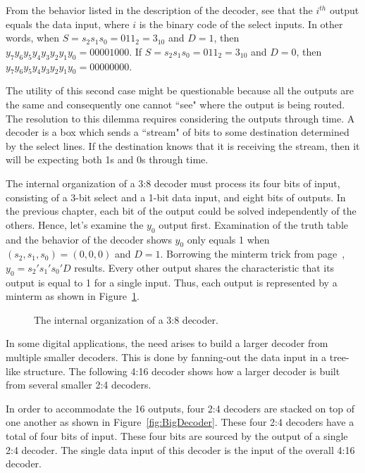 From the behavior listed in the description of the decoder, 
see that the $i^{th}$ output equals the data input, where
$i$ is the binary code of the select inputs.  In other
words, when $S=s_2 s_1 s_0 = 011_2 = 3_{10}$ and $D=1$,
then $y_7 y_6 y_5 y_4 y_3 y_2 y_1 y_0 = 00001000$.  If 
$S= s_2 s_1 s_0 = 011_2 = 3_{10}$ and $D=0$, then
$y_7 y_6 y_5 y_4 y_3 y_2 y_1 y_0 = 00000000$.   

The utility of this second case might be questionable because
all the outputs are the same and consequently one cannot
``see" where the output is being routed.  The resolution
to this dilemma requires considering the outputs 
through time.  A decoder is a box which sends a ``stream" of 
bits to some destination determined by the select lines.
If the destination knows that it is receiving the stream, then it
will be expecting both 1s and 0s through time.

The internal organization of a 3:8 decoder must process its four bits
of input, consisting of a 3-bit select and a 1-bit data input, and
eight bits of outputs.  In 
the previous chapter, each bit of the output could
be solved independently of the others. Hence, let's examine the $y_0$
output first.  Examination of the truth table and the behavior of
the decoder shows $y_0$ only equals 1 when
$(s_2, s_1, s_0) = (0, 0, 0)$ and $D=1$.  Borrowing the minterm
trick from page~\pageref{page:MinTrick}, $y_0=s_2's_1's_0'D$ results.
Every other output shares the characteristic that its output is
equal to 1 for a single input. Thus, each output is represented
by a minterm as shown in Figure~\ref{fig:3:8Guts}.

\begin{figure}[ht]
\caption{The internal organization of a 3:8 decoder.}
\label{fig:3:8Guts}
\end{figure}

In some digital applications, the need arises to build a larger decoder
from multiple smaller decoders.  This is done by fanning-out the data input
in a tree-like structure.  The following 4:16 decoder shows how a larger decoder is
built from several smaller 2:4 decoders. 

In order to accommodate the 16 outputs, four 2:4 decoders are stacked
on top of one another as shown in Figure~\ref{fig:BigDecoder}.  These
four 2:4 decoders have a total of four bits of input.  These four bits
are sourced by the output of a single 2:4 decoder.  The
single data input of this decoder is the input of the overall 4:16
decoder.  

